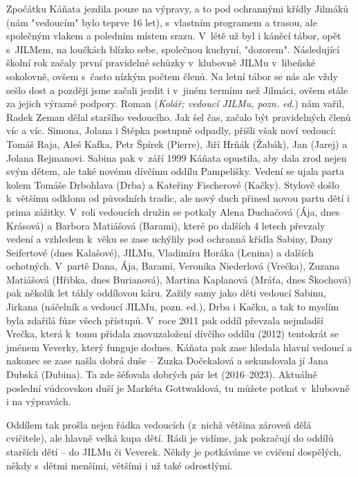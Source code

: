 \documentclass[a5paper, 12pt, twoside]{article}
\begin{document}
Zpočátku Káňata jezdila pouze na výpravy, a to pod ochrannými křídly
Jilmáků (nám "vedoucím" bylo teprve 16 let), s~vlastním programem a
trasou, ale společným vlakem a poledním místem srazu. V~létě už byl i
káněcí tábor, opět s~JILMem, na loučkách blízko sebe, společnou kuchyní,
"dozorem". Následující školní rok začaly první pravidelné schůzky
v~klubovně JILMu v~libeňské sokolovně, ovšem s~často nízkým počtem členů.
Na letní tábor se nás ale vždy sešlo dost a později jsme začali jezdit i
v~jiném termínu než Jilmáci, ovšem stále za jejich výrazné podpory.
Roman (\textit{Kolář; vedoucí JILMu, pozn. ed.}) nám vařil, Radek Zeman
dělal staršího vedoucího. Jak šel čas, začalo být pravidelných členů víc
a víc. Simona, Jolana i Štěpka postupně odpadly, přišli však noví
vedoucí: Tomáš Raja, Aleš Kafka, Petr Špírek (Pierre), Jiří Hrňák
(Žabák), Jan (Jarej) a Jolana Rejmanovi. Sabina pak v~září 1999 Káňata
opustila, aby dala zrod nejen svým dětem, ale také novému dívčímu oddílu
Pampelišky. Vedení se ujala parta kolem Tomáše Drbohlava (Drba) a
Kateřiny Fischerové (Kačky). Stylově došlo k~většímu odklonu od
původních tradic, ale nový duch přinesl novou partu dětí i prima
zážitky. V~roli vedoucích družin se potkaly Alena Duchačová (Ája, dnes
Krásová) a Barbora Matiášová (Barami), které po dalších 4 letech
převzaly vedení a vzhledem k~věku se zase uchýlily pod ochranná křídla
Sabiny, Dany Seifertové (dnes Kalašové), JILMu, Vladimíra Horáka
(Lenina) a dalších ochotných. V~partě Dana, Ája, Barami, Veronika
Niederlová (Vrečka), Zuzana Matiášová (Hřibka, dnes Burianová), Martina
Kaplanová (Mráťa, dnes Škochová) pak několik let táhly oddílovou káru.
Zažily samy jako děti vedoucí Sabinu, Jirkana (náčelník a vedoucí JILMu,
pozn. ed.), Drba i Kačku, a tak to myslím byla zdařilá fúze všech
přístupů. V~roce 2011 pak oddíl převzala nejmladší Vrečka, která k~tomu
přidala znovuzaložení dívčího oddílu (2012) tentokrát se jménem Veverky,
který funguje dodnes. Káňata pak zase hledala hlavní vedoucí a nakonec
se zase našla dobrá duše -- Zuzka Dočekalová a sekundovala jí Jana
Dubská (Dubina). Ta zde šéfovala dobrých pár let (2016--2023). Aktuálně
poslední vůdcovskou duší je Markéta Gottwaldová, tu můžete potkat
v~klubovně i na výpravách.

Oddílem tak prošla nejen řádka vedoucích (z~nichž většina zároveň dělá
cvičitele), ale hlavně velká kupa dětí. Rádi je vidíme, jak pokračují do
oddílů starších dětí -- do JILMu či Veverek. Někdy je potkáváme ve
cvičení dospělých, někdy s~dětmi menšími, většími i už také odrostlými.
\end{document}
